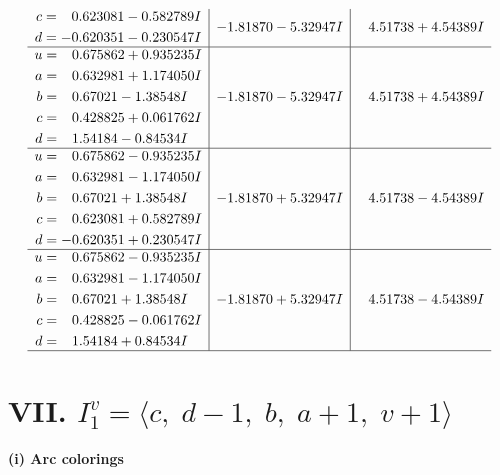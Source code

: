 \documentclass[1p]{elsarticle_modified}
\theoremstyle{definition}
\begin{document}
$$\begin{array}{c|c|c}
\begin{aligned}
c &= \phantom{-}0.623081 - 0.582789 I \\
d &= -0.620351 - 0.230547 I\end{aligned}
 & -1.81870 - 5.32947 I & \phantom{-}4.51738 + 4.54389 I \\ \hline\begin{aligned}
u &= \phantom{-}0.675862 + 0.935235 I \\
a &= \phantom{-}0.632981 + 1.174050 I \\
b &= \phantom{-}0.67021 - 1.38548 I \\
c &= \phantom{-}0.428825 + 0.061762 I \\
d &= \phantom{-}1.54184 - 0.84534 I\end{aligned}
 & -1.81870 - 5.32947 I & \phantom{-}4.51738 + 4.54389 I \\ \hline\begin{aligned}
u &= \phantom{-}0.675862 - 0.935235 I \\
a &= \phantom{-}0.632981 - 1.174050 I \\
b &= \phantom{-}0.67021 + 1.38548 I \\
c &= \phantom{-}0.623081 + 0.582789 I \\
d &= -0.620351 + 0.230547 I\end{aligned}
 & -1.81870 + 5.32947 I & \phantom{-}4.51738 - 4.54389 I \\ \hline\begin{aligned}
u &= \phantom{-}0.675862 - 0.935235 I \\
a &= \phantom{-}0.632981 - 1.174050 I \\
b &= \phantom{-}0.67021 + 1.38548 I \\
c &= \phantom{-}0.428825 - 0.061762 I \\
d &= \phantom{-}1.54184 + 0.84534 I\end{aligned}
 & -1.81870 + 5.32947 I & \phantom{-}4.51738 - 4.54389 I\\
 \hline 
 \end{array}$$\newpage\newpage\renewcommand{\arraystretch}{1}
\centering \section*{VII. $I^v_{1}= \langle c,\;d-1,\;b,\;a+1,\;v+1 \rangle$}
\flushleft \textbf{(i) Arc colorings}\\
\end{document}
